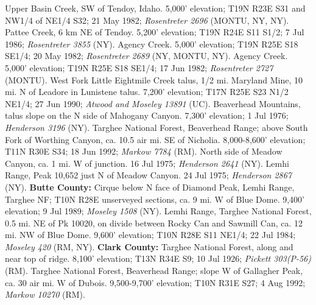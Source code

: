 Upper Basin Creek, SW of Tendoy, Idaho. 5,000' elevation; T19N R23E S31 and
NW1/4 of NE1/4 S32; 21 May 1982; \textit{Rosentreter 2696} (MONTU, NY, NY).
Pattee Creek, 6 km NE of Tendoy. 5,200' elevation; T19N R24E S11 S1/2;
7 Jul 1986; \textit{Rosentreter 3855} (NY).
Agency Creek. 5,000' elevation; T19N R25E S18  SE1/4;
20 May 1982; \textit{Rosentreter 2689} (NY, MONTU, NY).
Agency Creek. 5,000' elevation; T19N R25E S18 SE1/4; 17 Jun 1982;
\textit{Rosentreter 2727} (MONTU).
West Fork Little Eightmile Creek talus, 1/2 mi. Maryland Mine, 10 mi. N of
Leadore in Lunistene talus. 7,200' elevation; T17N R25E S23 N1/2 NE1/4;
27 Jun 1990; \textit{Atwood and Moseley 13891} (UC).
Beaverhead Mountains, talus slope on the N side of Mahogany Canyon.
7,300' elevation; 1 Jul 1976; \textit{Henderson 3196} (NY).
Targhee National Forest, Beaverhead Range; above South Fork of Worthing Canyon,
ca. 10.5 air mi. SE of Nicholia. 8,000-8,600' elevation; T11N R30E S34;
18 Jun 1992; \textit{Markow 7784} (RM).
North side of Meadow Canyon, ca. 1 mi. W of junction. 16 Jul 1975;
\textit{Henderson 2641} (NY).
Lemhi Range, Peak 10,652 just N of Meadow Canyon. 24 Jul 1975;
\textit{Henderson 2867} (NY).
  \textbf{Butte County:}
Cirque below N face of Diamond Peak, Lemhi Range, Targhee NF; T10N R28E
unserveyed sections, ca. 9 mi. W of Blue Dome. 9,400' elevation; 9 Jul 1989;
\textit{Moseley 1508} (NY).
Lemhi Range, Targhee National Forest, 0.5 mi. NE of Pk 10020, on divide between
Rocky Can and Sawmill Can, ca. 12 mi. NW of Blue Dome. 9,600' elevation;
T10N R28E S11 NE1/4; 22 Jul 1984; \textit{Moseley 420} (RM, NY).
  \textbf{Clark County:}
Targhee National Forest, along and near top of ridge. 8,100' elevation;
T13N R34E S9; 10 Jul 1926; \textit{Pickett 303(P-56)} (RM).
Targhee National Forest, Beaverhead Range; slope W of Gallagher Peak, ca. 30
air mi. W of Dubois. 9,500-9,700' elevation; T10N R31E S27; 4 Aug 1992;
\textit{Markow 10270} (RM).

